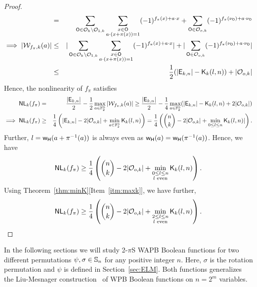\documentclass{llncs}
\begin{document}
\begin{proof}
\begin{eqnarray*}
& =  & \sum_{\mathsf{O} \in \mathcal{O}_k\setminus \mathcal{O}_{1,k}} \sum_{\substack{x \in \mathsf{O} \\ a \cdot (x + \pi(x))= 1}} (-1)^{f_\pi(x)+ a \cdot x} + \sum_{\mathsf{O} \in \mathcal{O}_{o,k}} (-1)^{ f_\pi(\nu_{\mathsf{O}}) + a \cdot \nu_{\mathsf{O}}}\nonumber \\
\implies |\mathcal{W}_{f_\pi,k}(a)| & \leq & |\sum_{\mathsf{O} \in \mathcal{O}_k\setminus \mathcal{O}_{1,k}} \sum_{\substack{x \in \mathsf{O} \\ a \cdot (x + \pi(x))= 1}} (-1)^{f_\pi(x)+ a \cdot x}| + |\sum_{\mathsf{O} \in \mathcal{O}_{o,k}} (-1)^{ f_\pi(\nu_{\mathsf{O}}) + a \cdot \nu_{\mathsf{O}}}|\nonumber \\
& \leq & \frac{1}{2} (|\mathsf{E}_{k,n}| - \mathsf{K}_{k}(l,n)) + |\mathcal{O}_{o,k}|
\end{eqnarray*}
Hence, the nonlinearity of $f_\pi$ satisfies
\begin{eqnarray*}
\mathsf{NL}_{k}(f_\pi) & = & \frac{|\mathsf{E}_{k,n}|}{2} -\frac{1}{2} \max_{a\in \mathbb{F}_2^n}| \mathcal{W}_{f_\pi,k}(a)| \geq \frac{|\mathsf{E}_{k,n}|}{2} - \frac{1}{4}\max_{a\in \mathbb{F}_2^n} (|\mathsf{E}_{k,n}| - \mathsf{K}_{k}(l,n) + 2|\mathcal{O}_{o,k}|) \\
\implies \mathsf{NL}_{k}(f_\pi) & \geq & \frac{1}{4}\left(|\mathsf{E}_{k,n}|  - 2|\mathcal{O}_{o,k}| + \min_{a\in \mathbb{F}_2^n} \mathsf{K}_{k}(l,n)\right)
= \frac{1}{4}\left({n \choose k}  - 2|\mathcal{O}_{o,k}| + \min_{0 \leq l \leq n} \mathsf{K}_{k}(l,n)|\right).
\end{eqnarray*}
Further, $l = \mathsf{w_H}(a+\pi^{-1}(a))$ is always even as $\mathsf{w_H}(a) = \mathsf{w_H}(\pi^{-1}(a))$. Hence, we have
$$\mathsf{NL}_{k}(f_\pi) \geq \frac{1}{4}\left({n \choose k} - 2|\mathcal{O}_{o,k}| + \min_{\substack{0 \leq l \leq n \\ l \text{ even}}} \mathsf{K}_{k}(l,n)\right).$$
Using Theorem~\ref{thm:minK}[Item~\ref{itm:maxk}], we have further,
$$\mathsf{NL}_{k}(f_\pi) \geq \frac{1}{4}\left({n \choose k} - 2|\mathcal{O}_{o,k}| + \min_{\substack{2 \leq l \leq n \\ l \text{ even}}} \mathsf{K}_{k}(l,n)\right).$$
\end{proof}


In the following sections we will study 2-$\pi$S WAPB Boolean functions for two different permutations $\psi, \sigma \in \mathbb{S}_n$ for any positive integer $n$.
Here, $\sigma$ is the rotation permutation and $\psi$ is defined in Section~\ref{sec:ELM}. Both functions generalizes the Liu-Mesnager construction~\cite{DCC:LiuMes19} of WPB Boolean functions on $n = 2^m$ variables.

\end{document}
